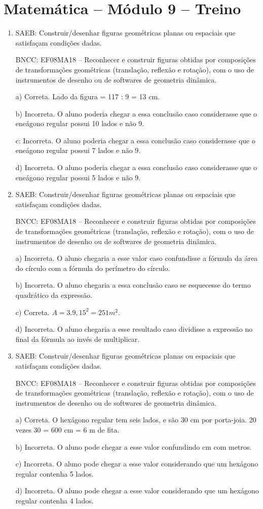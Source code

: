 \section*{Matemática – Módulo 9 – Treino}
\begin{enumerate}
\item SAEB: Construir/desenhar figuras geométricas planas ou espaciais que
satisfaçam condições dadas.

BNCC: EF08MA18 -- Reconhecer e construir figuras obtidas por composições
de transformações geométricas (translação, reflexão e rotação), com o
uso de instrumentos de desenho ou de softwares de geometria dinâmica.

a) Correta. Lado da figura = 117 : 9 = 13 cm.

b) Incorreta. O aluno poderia chegar a essa conclusão caso
considerasse que o eneágono regular possui 10 lados e não 9.

c: Incorreta. O aluno poderia chegar a essa conclusão caso
considerasse que o eneágono regular possui 7 lados e não 9.

d) Incorreta. O aluno poderia chegar a essa conclusão caso
considerasse que o eneágono regular possui 5 lados e não 9.
\item SAEB: Construir/desenhar figuras geométricas planas ou espaciais que
satisfaçam condições dadas.

BNCC: EF08MA18 -- Reconhecer e construir figuras obtidas por composições
de transformações geométricas (translação, reflexão e rotação), com o
uso de instrumentos de desenho ou de softwares de geometria dinâmica.

a) Incorreta. O aluno chegaria a esse valor caso confundisse a
fórmula da área do círculo com a fórmula do perímetro do círculo.

b) Incorreta. O aluno chegaria a essa conclusão caso se esquecesse
do termo quadrático da expressão.

c) Correta. $A = 3 . 9,15^2 = 251 m^2$.

d) Incorreta. O aluno chegaria a esse resultado caso dividisse a
expressão no final da fórmula ao invés de multiplicar.
\item SAEB: Construir/desenhar figuras geométricas planas ou espaciais que
satisfaçam condições dadas.

BNCC: EF08MA18 -- Reconhecer e construir figuras obtidas por composições
de transformações geométricas (translação, reflexão e rotação), com o
uso de instrumentos de desenho ou de softwares de geometria dinâmica.

a) Correta. O hexágono regular tem seis lados, e são 30 cm por porta-joia.
20 vezes 30 = 600 cm = 6 m de fita.

b) Incorreta. O aluno pode chegar a esse valor confundindo cm com
metros.

c) Incorreta. O aluno pode chegar a esse valor considerando que um
hexágono regular contenha 5 lados.

d) Incorreta. O aluno pode chegar a esse valor considerando que um
hexágono regular contenha 4 lados.
\end{enumerate}


